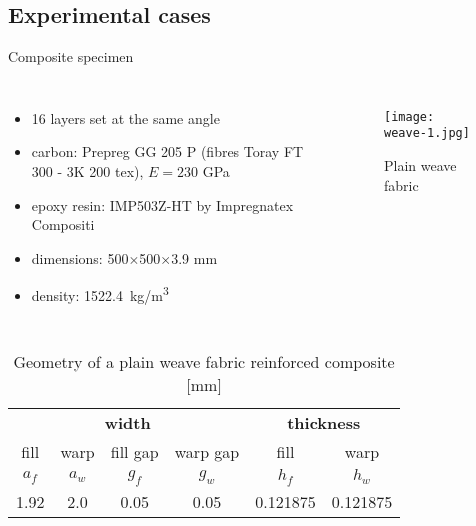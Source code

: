 \documentclass[10pt,aspectratio=169,dvipsnames]{beamer} %
\newcounter{angle}
\begin{document}
	\subsection{Experimental cases}
	\begin{frame}[t]{Composite specimen}
		\begin{columns}[T]
			{\small
				\begin{itemize}
					\item 16 layers set at the same angle \\
					\item carbon: Prepreg GG 205  P (fibres Toray FT 300 - 3K 200 tex), $E=230$ GPa
					\item epoxy resin: IMP503Z-HT by Impregnatex Compositi 
					\item dimensions: 500$\times$500$\times$3.9 mm\\
					\item density: 1522.4~kg/m\textsuperscript{3}
				\end{itemize}
			}
			\begin{figure}
				\texttt{[image: weave-1.jpg]}
				\caption{Plain weave fabric}
			\end{figure}
		\end{columns}
		\begin{table}[h]
			\renewcommand{\arraystretch}{1.1}
			\centering \footnotesize
			\caption{Geometry of a plain weave fabric reinforced composite [mm]}
			\begin{tabular}{cccccc} 
				\toprule[1.5pt]
				\multicolumn{4}{c}{\textbf{width} }	& \multicolumn{2}{c}{\textbf{thickness} }  \\ 
				\cmidrule(lr){1-4} \cmidrule(lr){5-6} 
				fill & warp & fill gap& warp gap& fill & warp\\
				$a_f$ &$a_w$& $g_f$  & $g_w$  & $h_f$& $h_w$ \\ 
				\cmidrule(lr){1-2} \cmidrule(lr){3-4} \cmidrule(lr){5-6}
				1.92 &2.0& 0.05& 0.05 & 0.121875 & 0.121875 \\
				\bottomrule[1.5pt] 
			\end{tabular} 
		\label{tab:weave_geo}
		\end{table}
	\end{frame}
\end{document}
